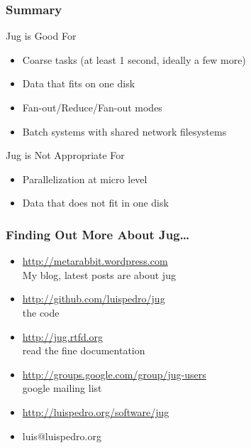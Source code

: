 \documentclass{beamer}
\begin{document}
\begin{frame}[fragile]
\frametitle{Summary}
\begin{block}{Jug is Good For}
\begin{itemize}
\item Coarse tasks (at least 1 second, ideally a few more)
\item Data that fits on one disk
\item Fan-out/Reduce/Fan-out modes
\item Batch systems with shared network filesystems
\end{itemize}
\end{block}

\begin{block}{Jug is Not Appropriate For}
\begin{itemize}
\item Parallelization at micro level
\item Data that does not fit in one disk
\end{itemize}
\end{block}
\end{frame}

\begin{frame}[fragile]
\frametitle{Finding Out More About Jug\ldots}
\begin{itemize}
\item \url{http://metarabbit.wordpress.com}\\My blog, latest posts are about jug
\item \url{http://github.com/luispedro/jug}\\the code
\item \url{http://jug.rtfd.org}\\read the fine documentation
\item \url{http://groups.google.com/group/jug-users}\\google mailing list
\item \url{http://luispedro.org/software/jug}
\item luis@luispedro.org
\end{itemize}

\end{frame}
\end{document}
